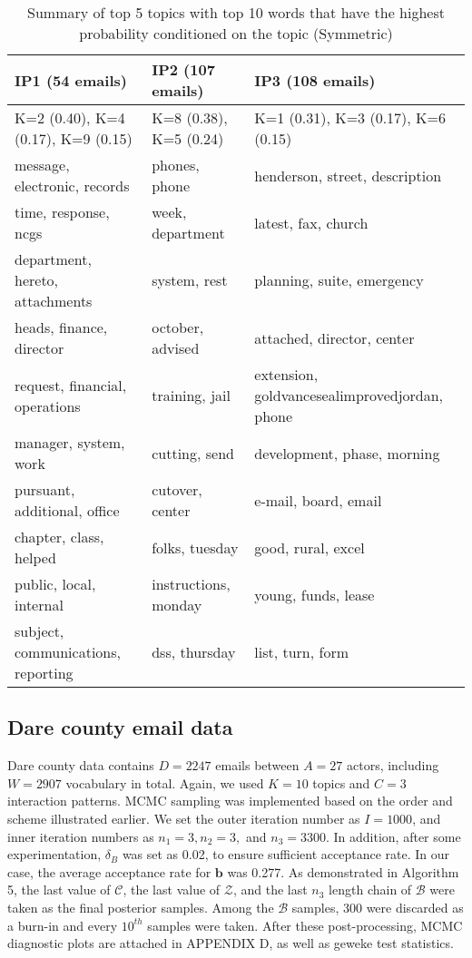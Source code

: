 \documentclass[a4paper]{article}
\begin{document}
 \begin{table}[ht]
 	\centering
 	\begin{tabular}{|l||l||l|}
 		\hline
 		{\textbf{IP1} (54 emails)}&{\textbf{IP2} (107 emails)}&{\textbf{IP3} (108 emails)}\\
 		\hline\hline
 		K=2 (0.40), K=4 (0.17), K=9 (0.15) & K=8 (0.38), K=5 (0.24)& K=1 (0.31), K=3 (0.17), K=6 (0.15)\\
 		\hline
 		message, electronic, records&phones, phone& henderson, street, description\\
 		time, response, ncgs & week, department& latest, fax, church\\
 		department, hereto, attachments& system, rest& planning, suite, emergency\\
 		heads, finance, director& october, advised& attached, director, center\\
 		request, financial, operations& training, jail& extension, goldvancesealimprovedjordan, phone\\
 		manager, system, work& cutting, send& development, phase, morning\\
 		pursuant, additional, office & cutover, center& e-mail, board, email\\
 		chapter, class, helped& folks, tuesday& good, rural, excel\\ 
 		public, local, internal& instructions, monday& young, funds, lease\\
 		subject, communications, reporting& dss, thursday& list, turn, form\\
 		\hline
 	\end{tabular}
 	\caption {Summary of top 5 topics with top 10 words that have the highest probability conditioned on the topic (Symmetric)}
 	\label{table:VancewordsMCMC}
 \end{table}
 \subsection{Dare county email data} \label{subsec: Dare county email data}
 Dare county data contains $D=2247$ emails between $A=27$ actors, including $W=2907$ vocabulary in total. Again, we used $K=10$ topics and $C=3$ interaction patterns. MCMC sampling was implemented based on the order and scheme illustrated earlier. We set the outer iteration number as $I=1000$, and inner iteration numbers as $n_1=3, n_2=3,$ and $n_3=3300$. In addition, after some experimentation, $\delta_B$ was set as 0.02, to ensure sufficient acceptance rate. In our case, the average acceptance rate for $\boldsymbol{b}$ was 0.277. As demonstrated in Algorithm 5, the last value of $\mathcal{C}$, the last value of $\mathcal{Z}$, and the last $n_3$ length chain of $\mathcal{B}$ were taken as the final posterior samples. Among the $\mathcal{B}$ samples, 300 were discarded as a burn-in and every $10^{th}$ samples were taken. After these post-processing, MCMC diagnostic plots are attached in APPENDIX D, as well as geweke test statistics. 
 \clearpage
\end{document}
